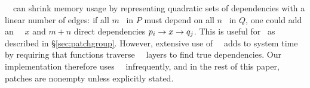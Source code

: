 \Noop\ \patches\ can shrink memory usage by representing quadratic sets of
 dependencies with a linear number of edges: if all $m$ \patches\ in $P$
 must depend on all $n$ \patches\ in $Q$, one could
 add an \noop\ \patch\ $x$ and $m+n$ direct dependencies
 $p_i \rightarrow x \rightarrow q_j$.
%
This is useful for \patchgroups\ as described in \S\ref{sec:patchgroup}.
%
However, extensive use of \noop\ \patches\ adds to system time by
 requiring that functions traverse \noop\ \patch\ layers to find true
 dependencies.
%
Our implementation therefore uses \noop\ \patches\ infrequently, and in the
 rest of this paper, patches are nonempty unless explicitly
 stated.


\begin{comment}
To solve this problem, we introduce an additional type of \patch. The
prototypical \patch\ corresponds to some change on disk, but \Kudos\ also
supports \aemphnoop\ \patch\ type, which doesn't change the disk at all.
\Noop\ \patches\ can have \befores, like other \patches, but they don't need to
be written to disk: they are trivially satisfied when all of their \befores\ are
satisfied. Thus, they can be used to ``stand for'' entire sets of other changes.
%
This capability is extremely useful, and is used by most operations on disk
structures so that a single \patch\ can be returned that depends on the whole
change. Likewise, \anoop\ \patch\ can be passed in as a parameter to a disk
operation to make the whole operation depend on a set of other changes. \Noop\
\patches\ allow dependencies between sets with only a linear number of
dependency edges in the \patch\ graph, and without having to pass around arrays
of \patches.
%
The cost is that some functions may have to traverse trees of \noop\ \patches\
to determine true dependencies.
\end{comment}

